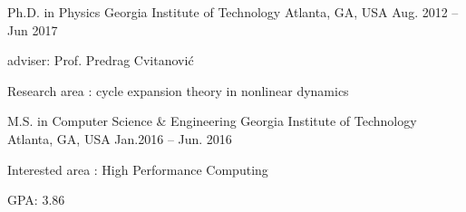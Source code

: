 


\begin{cventries}

\cventry
{Ph.D. in Physics}
{Georgia Institute of Technology}
{Atlanta, GA, USA}
{Aug. 2012 -- Jun 2017}
{
  \begin{cvitems}
    \item adviser: Prof. Predrag Cvitanovi\'c
    \item Research area : cycle expansion theory in nonlinear dynamics
  \end{cvitems}
}


\cventry
{M.S. in Computer Science \& Engineering }
{Georgia Institute of Technology}
{Atlanta, GA, USA}
{Jan.2016 -- Jun. 2016}
{
  \begin{cvitems}
    \item Interested area : High Performance Computing
    \item GPA: 3.86
  \end{cvitems}
}





\end{cventries}
